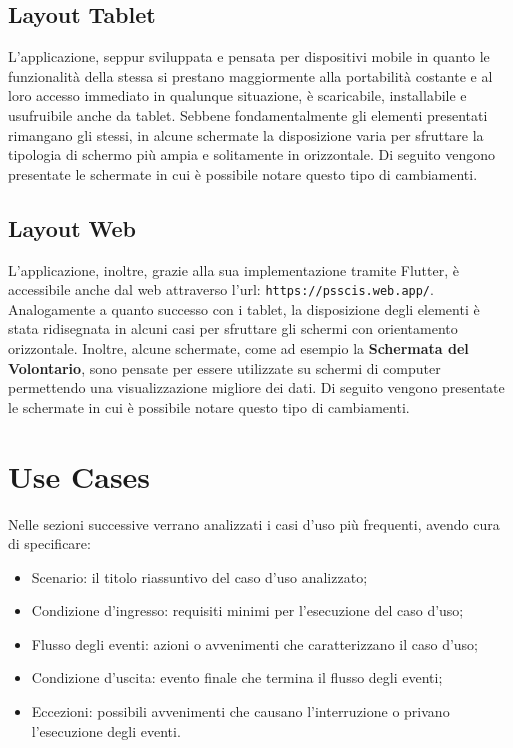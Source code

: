 \documentclass[12pt,a4paper,twoside,openright,titlepage]{book}
\begin{document}
\subsection{Layout Tablet}
L'applicazione, seppur sviluppata e pensata per dispositivi mobile in quanto le funzionalità della stessa si prestano maggiormente alla portabilità costante e al loro accesso immediato in qualunque situazione, è scaricabile, installabile e usufruibile anche da tablet. Sebbene fondamentalmente gli elementi presentati rimangano gli stessi, in alcune schermate la disposizione varia per sfruttare la tipologia di schermo più ampia e solitamente in orizzontale. Di seguito vengono presentate le schermate in cui è possibile notare questo tipo di cambiamenti.

\subsection{Layout Web}
L'applicazione, inoltre, grazie alla sua implementazione tramite Flutter, è accessibile anche dal web attraverso l'url: \texttt{https://psscis.web.app/}. Analogamente a quanto successo con i tablet, la disposizione degli elementi è stata ridisegnata in alcuni casi per sfruttare gli schermi con orientamento orizzontale. Inoltre, alcune schermate, come ad esempio la \textbf{Schermata del Volontario}, sono pensate per essere utilizzate su schermi di computer permettendo una visualizzazione migliore dei dati. Di seguito vengono presentate le schermate in cui è possibile notare questo tipo di cambiamenti.

\section{Use Cases}
Nelle sezioni successive verrano analizzati i casi d'uso più frequenti, avendo cura di specificare:
\begin{itemize}
\item Scenario: il titolo riassuntivo del caso d'uso analizzato;
\item Condizione d'ingresso: requisiti minimi per l'esecuzione del caso d'uso;
\item Flusso degli eventi: azioni o avvenimenti che caratterizzano il caso d'uso;
\item Condizione d'uscita: evento finale che termina il flusso degli eventi;
\item Eccezioni: possibili avvenimenti che causano l'interruzione o privano l'esecuzione degli eventi.
\end{itemize}
\end{document}
